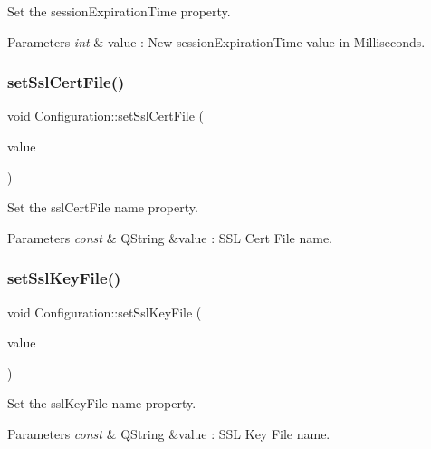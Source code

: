 Set the session\+Expiration\+Time property. 


\begin{DoxyParams}{Parameters}
{\em int} & value \+: New session\+Expiration\+Time value in Milliseconds. \\
\hline
\end{DoxyParams}
\mbox{\label{class_configuration_a16eecdd98ab2b9c4737f3178656bb3ad}} 
\subsubsection{\texorpdfstring{set\+Ssl\+Cert\+File()}{setSslCertFile()}}
{\footnotesize\ttfamily void Configuration\+::set\+Ssl\+Cert\+File (\begin{DoxyParamCaption}\item[{const Q\+String \&}]{value }\end{DoxyParamCaption})}



Set the ssl\+Cert\+File name property. 


\begin{DoxyParams}{Parameters}
{\em const} & Q\+String \&value \+: S\+SL Cert File name. \\
\hline
\end{DoxyParams}
\mbox{\label{class_configuration_a646d1ce1463b0519c745483a228c4949}} 
\subsubsection{\texorpdfstring{set\+Ssl\+Key\+File()}{setSslKeyFile()}}
{\footnotesize\ttfamily void Configuration\+::set\+Ssl\+Key\+File (\begin{DoxyParamCaption}\item[{const Q\+String \&}]{value }\end{DoxyParamCaption})}



Set the ssl\+Key\+File name property. 


\begin{DoxyParams}{Parameters}
{\em const} & Q\+String \&value \+: S\+SL Key File name. \\
\hline
\end{DoxyParams}
\mbox{\label{class_configuration_a4fc1c685775b37e7b553c3393f1b2998}} 
